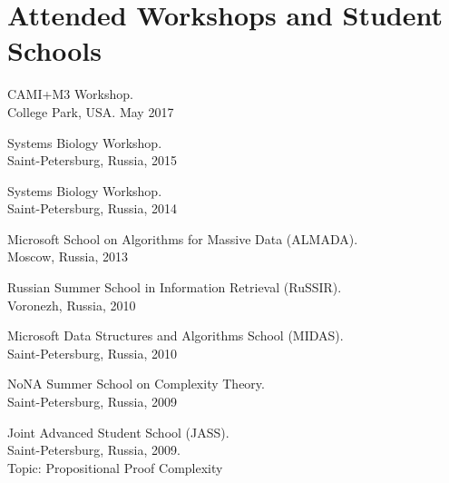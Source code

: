 \section{Attended Workshops and Student Schools}
%
\begin{innerlist}

\item CAMI+M3 Workshop. \\
College Park, USA. May 2017

\item Systems Biology Workshop. \\
Saint-Petersburg, Russia, 2015

\item Systems Biology Workshop. \\
Saint-Petersburg, Russia, 2014

\item Microsoft School on Algorithms for Massive Data (ALMADA). \\
Moscow, Russia, 2013

% 
% 

\item Russian Summer School in Information Retrieval (RuSSIR).\\ 
Voronezh, Russia, 2010

\item Microsoft Data Structures and Algorithms School (MIDAS).\\ 
Saint-Petersburg, Russia, 2010

\item NoNA Summer School on Complexity Theory.\\
Saint-Petersburg, Russia, 2009

\item Joint Advanced Student School (JASS).\\
Saint-Petersburg, Russia, 2009.\\ 
Topic: Propositional Proof Complexity

\end{innerlist}
